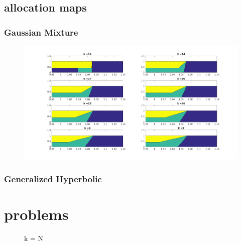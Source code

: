 \documentclass[16pt]{extarticle}
\begin{document}
\subsection{allocation maps}
\subsubsection{Gaussian Mixture}
\begin{figure}[H]
	\includegraphics[width=\textwidth]{Mixture.png}
\end{figure}

\subsubsection{Generalized Hyperbolic}



\section{problems}
\begin{figure}[H]
	\centering
	\hfill
	\caption{k = N}
\end{figure}
\end{document}
